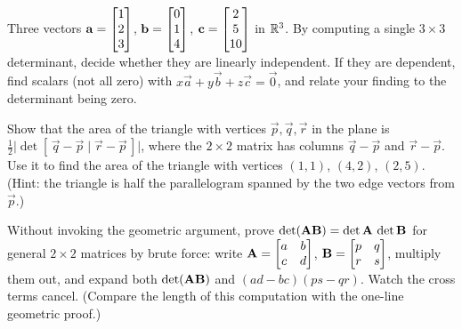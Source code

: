 \begin{exercise}
\label{ch21:ex-dependence}
Three vectors $\mathbf{a} = \begin{bmatrix}1\\2\\3\end{bmatrix}$, $\mathbf{b} = \begin{bmatrix}0\\1\\4\end{bmatrix}$,
$\mathbf{c} = \begin{bmatrix}2\\5\\10\end{bmatrix}$ in $\mathbb{R}^3$. By computing a single $3\times 3$
determinant, decide whether they are linearly independent. If they are dependent,
find scalars (not all zero) with $x\vec a + y\vec b + z\vec c = \vec 0$, and relate
your finding to the determinant being zero.
\end{exercise}

\begin{exercise}
\label{ch21:ex-triangle}
Show that the area of the triangle with vertices $\vec p, \vec q, \vec r$ in the
plane is $\tfrac{1}{2}\bigl|\det[\,\vec q - \vec p \mid \vec r - \vec p\,]\bigr|$,
where the $2\times 2$ matrix has columns $\vec q - \vec p$ and $\vec r - \vec p$.
Use it to find the area of the triangle with vertices $(1,1)$, $(4,2)$, $(2,5)$.
(Hint: the triangle is half the parallelogram spanned by the two edge vectors
from $\vec p$.)
\end{exercise}

\begin{exercise}
\label{ch21:ex-product-proof}
Without invoking the geometric argument, prove $\det(\mathbf{A}\mathbf{B}) =
\det\mathbf{A}\,\det\mathbf{B}$ for general $2\times 2$ matrices by brute force: write
$\mathbf{A} = \begin{bmatrix} a & b \\ c & d \end{bmatrix}$,
$\mathbf{B} = \begin{bmatrix} p & q \\ r & s \end{bmatrix}$, multiply them out, and
expand both $\det(\mathbf{A}\mathbf{B})$ and $(ad-bc)(ps-qr)$. Watch the cross terms
cancel. (Compare the length of this computation with the one-line geometric proof.)
\end{exercise}
